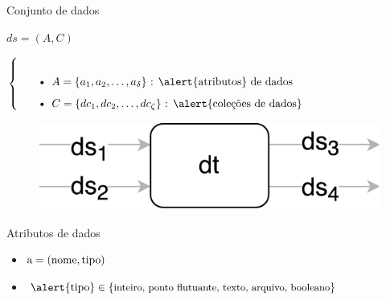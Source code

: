 \documentclass[12pt,compress,final]{beamer}
\newcommand{\nologo}{\setbeamertemplate{logo}{}} %
\begin{document}

{\nologo
\begin{frame}[t,squeeze]{Conjunto de dados}

\centerline{$ds = (A, C)$}

$\left\{
\begin{tabular}{p{\textwidth}}
\begin{itemize}
    \item \( A = \{a_1, a_2, \ldots, a_{\delta} \} \) : \alert{atributos} de dados
    \item \( C = \{dc_1, dc_2, \ldots, dc_{\zeta} \} \) : \alert{coleções de dados}
\end{itemize}
\end{tabular}
\right.$

\vfill

\begin{figure}
\includegraphics[width=.45\textwidth]{img/example-data-transformation.pdf}
\end{figure}

\vfill

\begin{block}{Atributos de dados}
\begin{itemize}
\item \( \textup{a} = (\textup{nome},\textup{tipo}) \)
\item $\textup{\alert{tipo}} \in \{\textup{\small inteiro, ponto flutuante, texto, arquivo, booleano}\}$
\end{itemize}
\end{block}

\end{frame}
}

\end{document}
